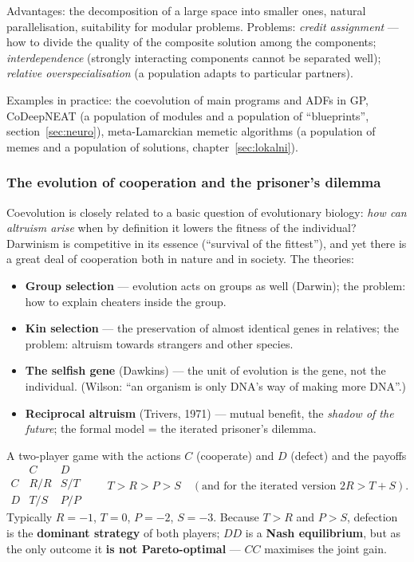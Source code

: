 \documentclass[11pt,a4paper]{article}
\theoremstyle{definition}
\providecommand{\uv}[1]{``#1''}
\begin{document}
Advantages: the decomposition of a large space into smaller ones, natural
parallelisation, suitability for modular problems. Problems: \emph{credit
assignment} --- how to divide the quality of the composite solution among the
components; \emph{interdependence} (strongly interacting components cannot be
separated well); \emph{relative overspecialisation} (a population adapts to
particular partners).

Examples in practice: the coevolution of main programs and ADFs in GP,
CoDeepNEAT (a population of modules and a population of \uv{blueprints},
section~\ref{sec:neuro}), meta-Lamarckian memetic algorithms (a population of
memes and a population of solutions, chapter~\ref{sec:lokalni}).

\subsubsection{The evolution of cooperation and the prisoner's dilemma}

Coevolution is closely related to a basic question of evolutionary biology:
\emph{how can altruism arise} when by definition it lowers the fitness of the
individual? Darwinism is competitive in its essence (\uv{survival of the
fittest}), and yet there is a great deal of cooperation both in nature and in
society. The theories:
\begin{itemize}
\item \textbf{Group selection} --- evolution acts on groups as well (Darwin);
  the problem: how to explain cheaters inside the group.
\item \textbf{Kin selection} --- the preservation of almost identical genes in
  relatives; the problem: altruism towards strangers and other species.
\item \textbf{The selfish gene} (Dawkins) --- the unit of evolution is the gene,
  not the individual. (Wilson: \uv{an organism is only DNA's way of making more
  DNA}.)
\item \textbf{Reciprocal altruism} (Trivers, 1971) --- mutual benefit, the
  \emph{shadow of the future}; the formal model = the iterated prisoner's
  dilemma.
\end{itemize}

\begin{defbox}
A two-player game with the actions $C$ (cooperate) and $D$ (defect) and the
payoffs
\[
\begin{array}{c|cc}
 & C & D\\\hline
C & R/R & S/T\\
D & T/S & P/P
\end{array}
\qquad
T > R > P > S \quad (\text{and for the iterated version } 2R > T+S).
\]
Typically $R=-1$, $T=0$, $P=-2$, $S=-3$. Because $T > R$ and $P > S$, defection
is the \textbf{dominant strategy} of both players; $DD$ is a \textbf{Nash
equilibrium}, but as the only outcome it \textbf{is not Pareto-optimal} ---
$CC$ maximises the joint gain.
\end{defbox}
\end{document}
